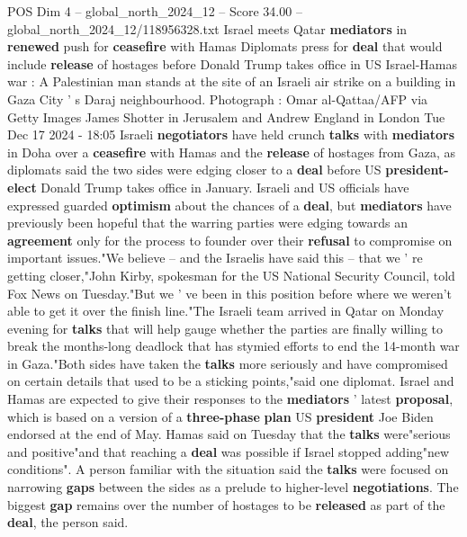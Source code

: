 \begin{textsample}{POS Dim 4 – global\_north\_2024\_12 – Score 34.00 – global\_north\_2024\_12/118956328.txt}  \label{ex:f4_pos_301}
Israel meets Qatar \textbf{mediators} in \textbf{renewed} push for \textbf{ceasefire} with Hamas Diplomats press for \textbf{deal} that would include \textbf{release} of hostages before Donald Trump takes office in US Israel-Hamas war : A Palestinian man stands at the site of an Israeli air strike on a building in Gaza City ' s Daraj neighbourhood.
Photograph : Omar al-Qattaa/AFP via Getty Images James Shotter in Jerusalem and Andrew England in London Tue Dec 17 2024 - 18:05 Israeli \textbf{negotiators} have held crunch \textbf{talks} with \textbf{mediators} in Doha over a \textbf{ceasefire} with Hamas and the \textbf{release} of hostages from Gaza, as diplomats said the two sides were edging closer to a \textbf{deal} before US \textbf{president-elect} Donald Trump takes office in January.
Israeli and US officials have expressed guarded \textbf{optimism} about the chances of a \textbf{deal}, but \textbf{mediators} have previously been hopeful that the warring parties were edging towards an \textbf{agreement} only for the process to founder over their \textbf{refusal} to compromise on important issues."We believe -- and the Israelis have said this -- that we ' re getting closer,"John Kirby, spokesman for the US National Security Council, told Fox News on Tuesday."But we ' ve been in this position before where we weren't able to get it over the finish line."The Israeli team arrived in Qatar on Monday evening for \textbf{talks} that will help gauge whether the parties are finally willing to break the months-long deadlock that has stymied efforts to end the 14-month war in Gaza."Both sides have taken the \textbf{talks} more seriously and have compromised on certain details that used to be a sticking points,"said one diplomat.
Israel and Hamas are expected to give their responses to the \textbf{mediators} ' latest \textbf{proposal}, which is based on a version of a \textbf{three-phase} \textbf{plan} US \textbf{president} Joe Biden endorsed at the end of May.
Hamas said on Tuesday that the \textbf{talks} were"serious and positive"and that reaching a \textbf{deal} was possible if Israel stopped adding"new conditions".
A person familiar with the situation said the \textbf{talks} were focused on narrowing \textbf{gaps} between the sides as a prelude to higher-level \textbf{negotiations}.
The biggest \textbf{gap} remains over the number of hostages to be \textbf{released} as part of the \textbf{deal}, the person said.

\end{textsample}
